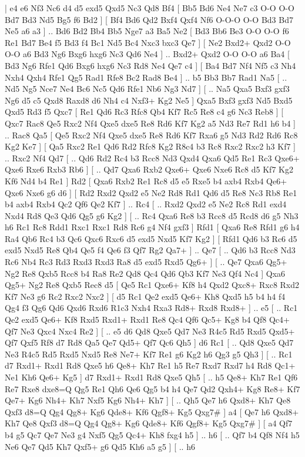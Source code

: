 \makegametitle 
|   e4   e6    Nf3   Nc6    d4   d5   exd5  Qxd5    Nc3   Qd8    Bf4 [  Bb5 Bd6  Ne4 Ne7  c3 O-O  O-O Bd7  Bd3 Nd5  Bg5 f6  Bd2   ]  [  Bf4 Bd6  Qd2 Bxf4  Qxf4 Nf6  O-O-O O-O  Bd3 Bd7  Ne5 a6  a3   ] .. Bd6    Bd2   Bb4    Bb5   Nge7    a3   Ba5    Ne2    [  Bd3 Bb6  Be3 O-O  O-O f6  Re1 Bd7  Be4 f5  Bd3 f4  Bc1 Nd5  Bc4 Nxc3  bxc3 Qe7   ]  [  Ne2 Bxd2+  Qxd2 O-O  O-O a6  Bd3 Ng6  Bxg6 hxg6  Nc3 Qd6  Ne4   ] .. Bxd2+    Qxd2   O-O    O-O   a6    Ba4 [  Bd3 Ng6  Rfe1 Qd6  Bxg6 hxg6  Nc3 Rd8  Ne4 Qe7  c4   ]  [  Ba4 Bd7  Nf4 Nf5  c3 Nh4  Nxh4 Qxh4  Rfe1 Qg5  Rad1 Rfe8  Bc2 Rad8  Be4   ] .. b5    Bb3   Bb7    Rad1   Na5 [ .. Nd5  Ng5 Nce7  Ne4 Bc6  Nc5 Qd6  Rfe1 Nb6  Ng3 Nd7   ]  [ .. Na5  Qxa5 Bxf3  gxf3 Ng6  d5 c5  Qxd8 Raxd8  d6 Nh4  c4 Nxf3+  Kg2 Ne5   ]  Qxa5   Bxf3    gxf3   Nd5    Bxd5   Qxd5    Rd3   f5    Qxc7 [  Re1 Qd6  Rc3 Rfc8  Qb4 Kf7  Rc5 Re8  c4 g6  Nc3 Reb8   ]  [  Qxc7 Rac8  Qe5 Rxc2  Nf4 Qxe5  dxe5 Re8  Rd6 Kf7  Kg2 a5  Nd3 Re7  Rd1 h6  b4   ] .. Rac8    Qa5 [  Qe5 Rxc2  Nf4 Qxe5  dxe5 Re8  Rd6 Kf7  Rxa6 g5  Nd3 Rd2  Rd6 Rc8  Kg2 Ke7   ]  [  Qa5 Rxc2  Re1 Qd6  Rd2 Rfc8  Kg2 R8c4  b3 Rc8  Rxc2 Rxc2  h3 Kf7   ] .. Rxc2    Nf4   Qd7 [ .. Qd6  Rd2 Rc4  b3 Rcc8  Nd3 Qxd4  Qxa6 Qd5  Re1 Rc3  Qxe6+ Qxe6  Rxe6 Rxb3  Rb6   ]  [ .. Qd7  Qxa6 Rxb2  Qxe6+ Qxe6  Nxe6 Rc8  d5 Kf7  Kg2 Kf6  Nd4 b4  Re1   ]  Rd2 [  Qxa6 Rxb2  Re1 Rc8  d5 e5  Rxe5 b4  axb4 Rxb4  Qe6+ Qxe6  Nxe6 g6  d6   ]  [  Rd2 Rxd2  Qxd2 e5  Ne2 Rd8  Rd1 Qd6  d5 Re8  Nc3 Rb8  Re1 b4  axb4 Rxb4  Qc2 Qf6  Qe2 Kf7   ] .. Rc4 [ .. Rxd2  Qxd2 e5  Ne2 Rc8  Rd1 exd4  Nxd4 Rd8  Qe3 Qd6  Qg5 g6  Kg2   ]  [ .. Rc4  Qxa6 Re8  b3 Rcc8  d5 Rcd8  d6 g5  Nh3 h6  Rc1 Rc8  Rdd1 Rxc1  Rxc1 Rd8  Rc6 g4  Nf4 gxf3   ]  Rfd1 [  Qxa6 Re8  Rfd1 g6  h4 Ra4  Qb6 Rc4  b3 Qc6  Qxc6 Rxc6  d5 exd5  Nxd5 Kf7  Kg2   ]  [  Rfd1 Qd6  b3 Rc6  d5 exd5  Nxd5 Re8  Qb4 Qe5  f4 Qe6  f3 Qf7  Rg2 Qa7+   ] .. Qe7 [ .. Qd6  b3 Rcc8  Nd3 Rc6  Nb4 Rc3  Rd3 Rxd3  Rxd3 Ra8  d5 exd5  Rxd5 Qg6+   ]  [ .. Qe7  Qxa6 Qg5+  Ng2 Re8  Qxb5 Rcc8  b4 Ra8  Re2 Qd8  Qc4 Qd6  Qb3 Kf7  Ne3 Qf4  Nc4   ]  Qxa6   Qg5+    Ng2   Re8    Qxb5   Rec8    d5 [  Qe5 Rc1  Qxe6+ Kf8  h4 Qxd2  Qxc8+ Rxc8  Rxd2 Kf7  Ne3 g6  Rc2 Rxc2  Nxc2   ]  [  d5 Rc1  Qe2 exd5  Qe6+ Kh8  Qxd5 h5  b4 h4  f4 Qg4  f3 Qg6  Qd6 Qxd6  Rxd6 R1c3  Nxh4 Rxa3  Rd8+ Rxd8  Rxd8+   ] .. e5 [ .. Rc1  Qe2 exd5  Qe6+ Kf8  Rxd5 Rxd1+  Rxd1 Re8  Qc4 Qf6  Qc5+ Kg8  b4 Qf8  Qc4+ Qf7  Ne3 Qxc4  Nxc4 Re2   ]  [ .. e5  d6 Qd8  Qxe5 Qd7  Ne3 R4c5  Rd5 Rxd5  Qxd5+ Qf7  Qxf5 Rf8  d7 Rd8  Qa5 Qe7  Qd5+ Qf7  Qc6 Qh5   ]  d6   Rc1 [ .. Qd8  Qxe5 Qd7  Ne3 R4c5  Rd5 Rxd5  Nxd5 Re8  Ne7+ Kf7  Re1 g6  Kg2 h6  Qg3 g5  Qh3   ]  [ .. Rc1  d7 Rxd1+  Rxd1 Rd8  Qxe5 h6  Qe8+ Kh7  Re1 h5  Re7 Rxd7  Rxd7 h4  Rd8 Qc1+  Ne1 Kh6  Qe6+ Kg5   ]  d7   Rxd1+    Rxd1   Rd8    Qxe5   Qh5 [ .. h5  Qe8+ Kh7  Re1 Qf6  Re7 Rxe8  dxe8=Q Qg5  Re1 Qh6  Qe6 Qg5  b4 h4  Qe7 Qd2  Qxh4+ Kg8  Re8+ Kf7  Qe7+ Kg6  Nh4+ Kh7  Nxf5 Kg6  Nh4+ Kh7   ]  [ .. Qh5  Qe7 h6  Qxd8+ Kh7  Qe8 Qxf3  d8=Q Qg4  Qg8+ Kg6  Qde8+ Kf6  Qgf8+ Kg5  Qxg7#   ]  a4 [  Qe7 h6  Qxd8+ Kh7  Qe8 Qxf3  d8=Q Qg4  Qg8+ Kg6  Qde8+ Kf6  Qgf8+ Kg5  Qxg7#   ]  [  a4 Qf7  b4 g5  Qc7 Qe7  Ne3 g4  Nxf5 Qg5  Qc4+ Kh8  fxg4 h5   ] .. h6 [ .. Qf7  b4 Qf8  Nf4 h5  Ne6 Qe7  Qd5 Kh7  Qxf5+ g6  Qd5 Kh6  a5 g5   ]  [ .. h6  